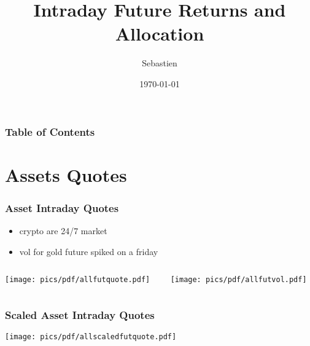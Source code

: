 \documentclass[9pt]{beamer}
\title[Intraday Future Returns]{Intraday Future Returns and Allocation}
\author[SH]{Sebastien}
\date[\today]{\today}
\begin{document}
\begin{frame}
    \titlepage 
\end{frame}
\begin{frame}
    \frametitle{Table of Contents} %
    \tableofcontents %
\end{frame}
\section{Assets Quotes} 
\begin{frame}
	\frametitle{Asset Intraday Quotes}
    \begin{itemize}
        \item crypto are 24/7 market
        \item vol for gold future spiked on a friday
    \end{itemize}
    \begin{columns}
    \begin{column}{.5\textwidth}
	    \texttt{[image: pics/pdf/allfutquote.pdf]}
    \end{column}
    \begin{column}{.5\textwidth}
	    \texttt{[image: pics/pdf/allfutvol.pdf]}
    \end{column}
    \end{columns}
\end{frame}
\begin{frame}
	\frametitle{Scaled Asset Intraday Quotes}
	    \texttt{[image: pics/pdf/allscaledfutquote.pdf]}
\end{frame}
\end{document}
